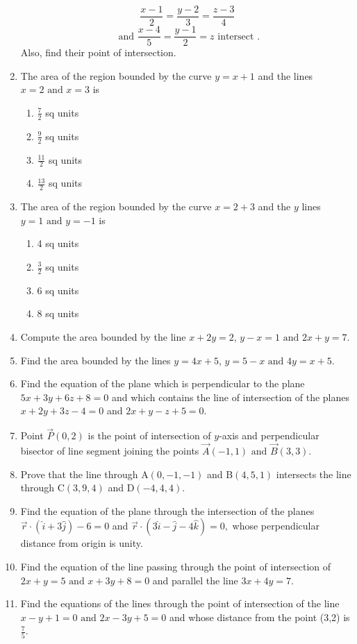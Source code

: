 \begin{enumerate}[label=\thesubsection.\arabic*,ref=\thesubsection.\theenumi]
$$\frac{x-1}{2}=\frac{y-2}{3}=\frac{z-3}{4}$$
$$\text{ and } \frac{x-4}{5}=\frac{y-1}{2}=z  \text{ intersect }.$$
 Also, find their point of intersection.
\item The area of the region bounded by the curve $y = x + 1$ and the lines $x = 2\text{ and }x = 3$ is
\begin{enumerate}
\item $\frac{7}{2}$ sq units
\item $\frac{9}{2}$ sq units
\item $\frac{11}{2}$ sq units
\item $\frac{13}{2}$ sq units
\end{enumerate}   
\item The area of the region bounded by the curve $x = 2 + 3$ and the $y$ lines $y = 1\text{ and }y = - 1$ is
\begin{enumerate}
\item 4 sq units 
\item $\frac{3}{2}$ sq units
\item 6 sq units
\item 8 sq units
\end{enumerate}
\item Compute the area bounded by the line $x + 2y = 2$, $y - x = 1\text{ and }2x + y = 7$.
\item Find the area bounded by the lines $y = 4x + 5$, $y = 5 - x\text{ and }4y = x + 5$.
\item Find the equation of the plane which is perpendicular to the plane $5x+3y+6z+8=0$ and which contains the line of intersection of the planes $x+2y+3z-4=0$ and $2x+y-z+5=0.$
\item  Point $\vec{P}(0,2)$ is the point of intersection of $y$-axis and perpendicular bisector of line segment joining the points $\vec{A}(-1,1) \text{ and } \vec{B}(3,3)$.
\item Prove that the line through A$(0,-1,-1)$ and B$(4,5,1)$ intersects the line through C$(3,9,4)$ and D$(-4,4,4)$.
\item Find the equation of the plane through the intersection of the planes $\overrightarrow{r} \cdot (\hat{i}+3\hat{j}) - 6=0$ and $\overrightarrow{r} \cdot (3\hat{i}-\hat{j}-4\hat{k})=0,$ whose perpendicular distance from origin is unity.
\item Find the equation of the line passing through the point of intersection of $2x+y=5\text{ and }x+3y+8=0$ and parallel the line $3x+4y=7$.
\item Find the equations of the lines through the point of intersection of the line $x-y+1=0 \text{ and }2x-3y+5=0$ and whose distance from the point (3,2) is $\frac{7}{5}$.

\end{enumerate}
